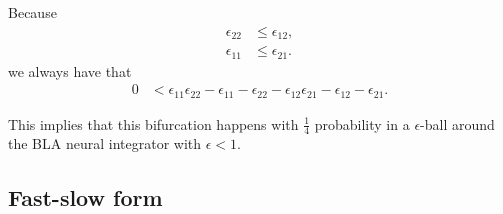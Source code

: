 \documentclass{article} %
\newcounter{ct}
\theoremstyle{definition}
\theoremstyle{remark}
\begin{document}
Because
\begin{align*}
\epsilon_{22} &\leq \epsilon_{12},\\
\epsilon_{11} &\leq \epsilon_{21}.
\end{align*}
we always have that
\begin{align*}
0 &< \epsilon_{11}\epsilon_{22}-\epsilon_{11}-\epsilon_{22}-\epsilon_{12}\epsilon_{21}-\epsilon_{12}-\epsilon_{21}.
\end{align*}


This implies that this bifurcation happens with $\frac{1}{4}$ probability in a $\epsilon$-ball around the BLA neural integrator with $\epsilon<1$.


\subsection{Fast-slow form}\label{sec:supp:fast_slow_form}
\end{document}
